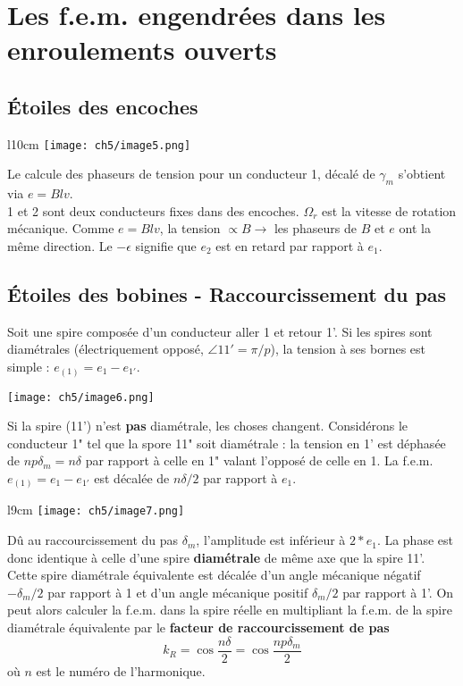\section{Les f.e.m. engendrées dans les enroulements ouverts}
	\subsection{Étoiles des encoches}
		\begin{wrapfigure}[11]{l}{10cm}
	\vspace{-5mm}
	\texttt{[image: ch5/image5.png]}
	\end{wrapfigure}
	Le calcule des phaseurs de tension pour un conducteur 1, décalé de 
	$\gamma_m$ s'obtient via $e= Blv$.\\
			1 et 2 sont deux conducteurs fixes dans des encoches. $\Omega_r$ 
	est la vitesse de rotation mécanique. Comme $e=Blv$, la tension $\propto B \rightarrow$ 
	les phaseurs de $B$ et $e$ ont la même direction. Le $-\epsilon$ signifie que $e_2$ 
	est en retard par rapport à $e_1$.\\
	

	\subsection{Étoiles des bobines - Raccourcissement du pas}
	Soit une spire composée d'un conducteur aller 1 et retour 1'. Si les spires sont 
	diamétrales (électriquement opposé, $\angle 11' = \pi/p$), la tension à ses bornes 
	est simple : $e_{(1)} = e_1-e_{1'}$.
	\begin{center}
	\texttt{[image: ch5/image6.png]}
	\end{center}
	
	\newpage	
	Si la spire (11') n'est \textbf{pas} diamétrale, les choses changent. Considérons 
	le conducteur 1" tel que la spore 11" soit diamétrale : la tension en 1' est 
	déphasée de $np\delta_m=n\delta$ par rapport à celle en 1" valant l'opposé de celle 
	en 1. La f.e.m. $e_{(1)}=e_1-e_{1'}$ est décalée de $n\delta/2$ par rapport à $e_1$.\\
	
	\begin{wrapfigure}[11]{l}{9cm}
	\vspace{-5mm}
	\texttt{[image: ch5/image7.png]}
	\end{wrapfigure}
	Dû au raccourcissement du pas $\delta_m$, l'amplitude est inférieur à $2*e_1$. La 
	phase est donc identique à celle d'une spire \textbf{diamétrale} de même axe que 
	la spire 11'. Cette spire diamétrale équivalente est décalée d'un angle mécanique 
	négatif $-\delta_m/2$ par rapport à 1 et d'un angle mécanique positif $\delta_m/2$ 
	par rapport à 1'. On peut alors calculer la f.e.m. dans la spire réelle en multipliant 
	la f.e.m. de la spire diamétrale équivalente par le \textbf{facteur de raccourcissement 
	de pas }
	\begin{equation}
	k_R = \cos\dfrac{n\delta}{2}=\cos\dfrac{np\delta_m}{2}
	\end{equation}
	où $n$ est le numéro de l'harmonique.
	
